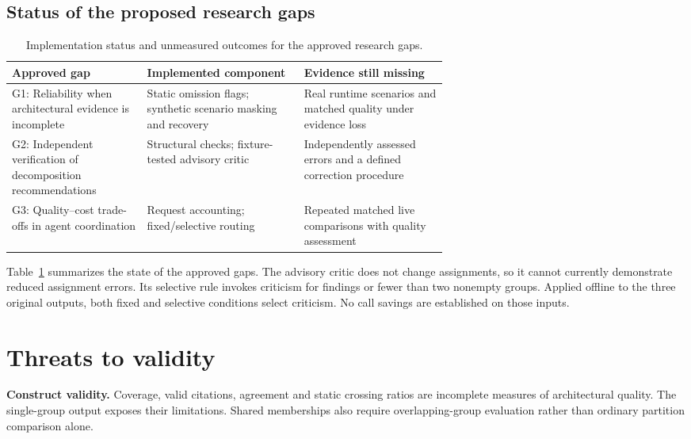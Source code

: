\subsection{Status of the proposed research gaps}

\begin{table}[t]
\centering
\caption{Implementation status and unmeasured outcomes for the approved research gaps.}
\label{tab:gaps}
\setlength{\tabcolsep}{4pt}
\renewcommand{\arraystretch}{1.12}
\begin{tabularx}{\linewidth}{@{}>{\raggedright\arraybackslash}p{0.31\linewidth}>{\raggedright\arraybackslash}X>{\raggedright\arraybackslash}p{0.33\linewidth}@{}}
\hline
\textbf{Approved gap} & \textbf{Implemented component} & \textbf{Evidence still missing} \\
\hline
G1: Reliability when architectural evidence is incomplete & Static omission flags; synthetic scenario masking and recovery & Real runtime scenarios and matched quality under evidence loss \\
G2: Independent verification of decomposition recommendations & Structural checks; fixture-tested advisory critic & Independently assessed errors and a defined correction procedure \\
G3: Quality--cost trade-offs in agent coordination & Request accounting; fixed/selective routing & Repeated matched live comparisons with quality assessment \\
\hline
\end{tabularx}
\end{table}


Table~\ref{tab:gaps} summarizes the state of the approved gaps. The advisory critic does not change assignments, so it cannot currently demonstrate reduced assignment errors. Its selective rule invokes criticism for findings or fewer than two nonempty groups. Applied offline to the three original outputs, both fixed and selective conditions select criticism. No call savings are established on those inputs.

\section{Threats to validity}

\textbf{Construct validity.} Coverage, valid citations, agreement and static crossing ratios are incomplete measures of architectural quality. The single-group output exposes their limitations. Shared memberships also require overlapping-group evaluation rather than ordinary partition comparison alone.

